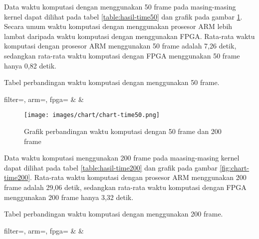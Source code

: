 Data waktu komputasi dengan menggunakan 50 frame pada masing-masing kernel dapat dilihat pada tabel \ref{table:hasil-time50} dan grafik pada gambar \ref{fig:chart-time50}. Secara umum waktu komputasi dengan menggunakan prosesor ARM lebih lambat daripada waktu komputasi dengan menggunakan FPGA. Rata-rata waktu komputasi dengan prosesor ARM menggunakan 50 frame adalah 7,26 detik, sedangkan rata-rata waktu komputasi dengan FPGA menggunakan 50 frame hanya 0,82 detik.
\begin{atable}
    \caption{Tabel perbandingan waktu komputasi dengan menggunakan 50 frame.}
    \label{table:hasil-time50}
        {
            filter=\filter, 
            arm=\arm, 
            fpga=\fpga}
        {
            \filter & 
            \arm & 
            \fpga }
\end{atable}
\begin{figure}[ht]
    \centering
    \texttt{[image: images/chart/chart-time50.png]}
    \caption{Grafik perbandingan waktu komputasi dengan 50 frame dan 200 frame}
    \label{fig:chart-time50}
\end{figure}


Data waktu komputasi menggunakan 200 frame pada maasing-masing kernel dapat dilihat pada tabel \ref{table:hasil-time200} dan grafik pada gambar \ref{fig:chart-time200}. Rata-rata waktu komputasi dengan prosesor ARM menggunakan 200 frame adalah 29,06 detik, sedangkan rata-rata waktu komputasi dengan FPGA menggunakan 200 frame hanya 3,32 detik.
\begin{atable}
    \caption{Tabel perbandingan waktu komputasi dengan menggunakan 200 frame.}
    \label{table:hasil-time200}
        {
            filter=\filter, 
            arm=\arm, 
            fpga=\fpga}
        {
            \filter & 
            \arm & 
            \fpga }
\end{atable}

